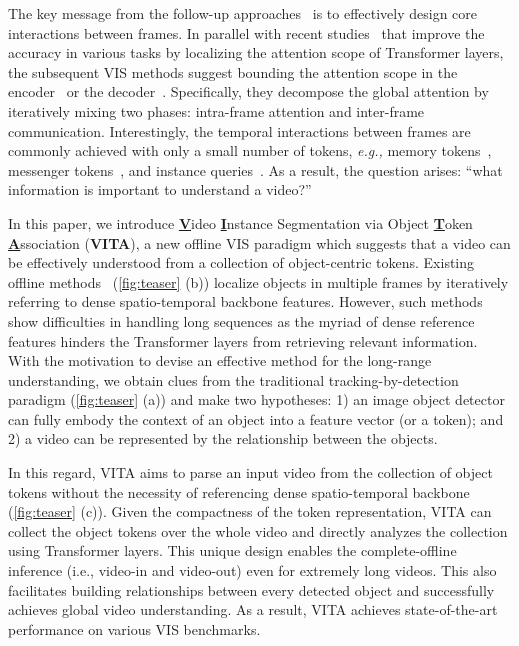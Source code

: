 \documentclass{article}
\begin{document}
The key message from the follow-up approaches~\cite{IFC, SeqFormer, Mask2Former-VIS, TeViT} is to effectively design core interactions between frames.
In parallel with recent studies~\cite{SMCA, TSP-RCNN, Deformable-DETR, Mask2Former, Swin} that improve the accuracy in various tasks by localizing the attention scope of Transformer layers, the subsequent VIS methods suggest bounding the attention scope in the encoder~\cite{IFC, TeViT} or the decoder~\cite{SeqFormer}.
Specifically, they decompose the global attention by iteratively mixing two phases: intra-frame attention and inter-frame communication.
Interestingly, the temporal interactions between frames are commonly achieved with only a small number of tokens, \textit{e.g.,} memory tokens~\cite{IFC, TeViT}, messenger tokens~\cite{TeViT}, and instance queries~\cite{SeqFormer}.
As a result, the question arises: ``what information is important to understand a video?''



In this paper, we introduce \underline{\textbf{V}}ideo \underline{\textbf{I}}nstance Segmentation via Object \underline{\textbf{T}}oken \underline{\textbf{A}}ssociation (\textbf{VITA}), a new offline VIS paradigm which suggests that a video can be effectively understood from a collection of object-centric tokens.
Existing offline methods~\cite{VisTR, IFC, SeqFormer, Mask2Former-VIS, TeViT}  (\cref{fig:teaser} (b)) localize objects in multiple frames by iteratively referring to dense spatio-temporal backbone features.
However, such methods show difficulties in handling long sequences as the myriad of dense reference features hinders the Transformer layers from retrieving relevant information.
With the motivation to devise an effective method for the long-range understanding, we obtain clues from the traditional tracking-by-detection paradigm (\cref{fig:teaser} (a)) and make two hypotheses: 1) an image object detector can fully embody the context of an object into a feature vector (or a token); and 2) a video can be represented by the relationship between the objects.

In this regard, VITA aims to parse an input video from the collection of object tokens without the necessity of referencing dense spatio-temporal backbone (\cref{fig:teaser} (c)).
Given the compactness of the token representation, VITA can collect the object tokens over the whole video and directly analyzes the collection using Transformer layers. 
This unique design enables the complete-offline inference (i.e., video-in and video-out) even for extremely long videos.
This also facilitates building relationships between every detected object and successfully achieves global video understanding.
As a result, VITA achieves state-of-the-art performance on various VIS benchmarks.
\end{document}

